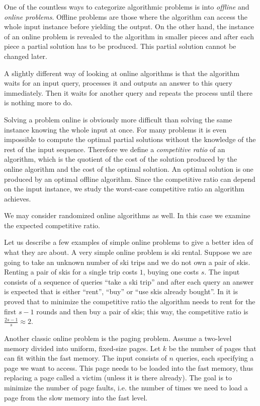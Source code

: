 One of the countless ways to categorize algorithmic problems is into
\emph{offline} and \emph{online problems}. Offline problems are those
where the algorithm can access the whole input instance before yielding
the output.  On the other hand, the instance of an online problem is
revealed to the algorithm in smaller pieces and after each piece a partial
solution has to be produced. This partial solution cannot be changed
later.

A slightly different way of looking at online algorithms is that the
algorithm waits for an input query, processes it and outputs an answer to
this query immediately. Then it waits for another query and repeats the
process until there is nothing more to do.

Solving a problem online is obviously more difficult than solving the same
instance knowing the whole input at once. For many problems it is even
impossible to compute the optimal partial solutions without the knowledge
of the rest of the input sequence. Therefore we define a \emph{competitive
ratio} of an algorithm, which is the quotient of the cost of the solution
produced by the online algorithm and the cost of the optimal solution. An
optimal solution is one produced by an optimal offline algorithm. Since
the competitive ratio can depend on the input instance, we study the
worst-case competitive ratio an algorithm achieves.

We may consider randomized online algorithms as well. In this case we
examine the expected competitive ratio.

Let us describe a few examples of simple online problems to give a better
idea of what they are about. A very simple online problem is ski rental.
Suppose we are going to take an unknown number of ski trips and we do not
own a pair of skis. Renting a pair of skis for a single trip costs $1$,
buying one costs $s$. The input consists of a sequence of queries ``take a
ski trip'' and after each query an answer is expected that is either
``rent'', ``buy'' or ``use skis already bought''. In \cite{skirental} it
is proved that to minimize the competitive ratio the algorithm needs to
rent for the first $s-1$ rounds and then buy a pair of skis; this way, the
competitive ratio is $\frac{2s-1}{s} \approx 2$.

Another classic online problem is the paging problem. Assume a two-level
memory divided into uniform, fixed-size pages. Let $k$ be the number of
pages that can fit within the fast memory. The input consists of $n$
queries, each specifying a page we want to access. This page needs to be
loaded into the fast memory, thus replacing a page called a victim (unless
it is there already). The goal is to minimize the number of page faults,
i.e. the number of times we need to load a page from the slow memory into
the fast level.

